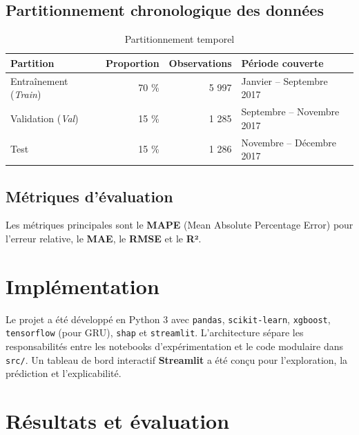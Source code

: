 \documentclass[12pt,a4paper]{article}
\begin{document}
\subsection{Partitionnement chronologique des données}
\begin{table}[h]
\centering
\begin{tabular}{lrrl}
\toprule
\textbf{Partition} & \textbf{Proportion} & \textbf{Observations} & \textbf{Période couverte} \\
\midrule
Entraînement (\textit{Train}) & 70 \% & 5 997 & Janvier – Septembre 2017 \\
Validation (\textit{Val}) & 15 \% & 1 285 & Septembre – Novembre 2017 \\
Test & 15 \% & 1 286 & Novembre – Décembre 2017 \\
\bottomrule
\end{tabular}
\caption{Partitionnement temporel}
\end{table}

\subsection{Métriques d'évaluation}
Les métriques principales sont le \textbf{MAPE} (Mean Absolute Percentage Error) pour l'erreur relative, le \textbf{MAE}, le \textbf{RMSE} et le \textbf{R²}.

\section{Implémentation}
Le projet a été développé en Python 3 avec \texttt{pandas}, \texttt{scikit-learn}, \texttt{xgboost}, \texttt{tensorflow} (pour GRU), \texttt{shap} et \texttt{streamlit}.
L'architecture sépare les responsabilités entre les notebooks d'expérimentation et le code modulaire dans \texttt{src/}. 
Un tableau de bord interactif \textbf{Streamlit} a été conçu pour l'exploration, la prédiction et l'explicabilité.

\section{Résultats et évaluation}
\end{document}
